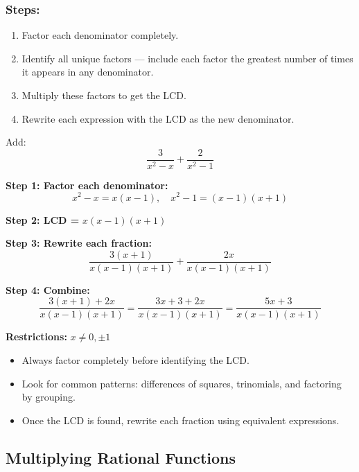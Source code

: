 \documentclass[11pt]{article}
\begin{document}
\subsubsection*{Steps:}
\begin{enumerate}
  \item Factor each denominator completely.
  \item Identify all unique factors — include each factor the greatest number of times it appears in any denominator.
  \item Multiply these factors to get the LCD.
  \item Rewrite each expression with the LCD as the new denominator.
\end{enumerate}

\begin{tcolorbox}
Add:
\[
\frac{3}{x^2 - x} + \frac{2}{x^2 - 1}
\]

\textbf{Step 1: Factor each denominator:}
\[
x^2 - x = x(x - 1), \quad x^2 - 1 = (x - 1)(x + 1)
\]

\textbf{Step 2: LCD = } \( x(x - 1)(x + 1) \)

\textbf{Step 3: Rewrite each fraction:}
\[
\frac{3(x + 1)}{x(x - 1)(x + 1)} + \frac{2x}{x(x - 1)(x + 1)}
\]

\textbf{Step 4: Combine:}
\[
\frac{3(x + 1) + 2x}{x(x - 1)(x + 1)} = \frac{3x + 3 + 2x}{x(x - 1)(x + 1)} = \frac{5x + 3}{x(x - 1)(x + 1)}
\]

\textbf{Restrictions:} \( x \neq 0, \pm1 \)

\end{tcolorbox}

\begin{tcolorbox}[colback=blue!5!white, colframe=blue!80!black, title=Tips for Factoring]
\begin{itemize}
  \item Always factor completely before identifying the LCD.
  \item Look for common patterns: differences of squares, trinomials, and factoring by grouping.
  \item Once the LCD is found, rewrite each fraction using equivalent expressions.
\end{itemize}
\end{tcolorbox}

\subsection{Multiplying Rational Functions}
\end{document}
